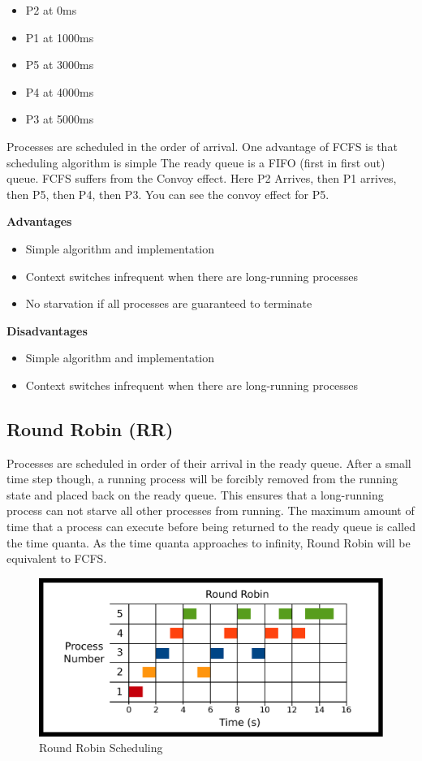 \begin{itemize}
\tightlist
\item
  P2 at 0ms
\item
  P1 at 1000ms
\item
  P5 at 3000ms
\item
  P4 at 4000ms
\item
  P3 at 5000ms
\end{itemize}

Processes are scheduled in the order of arrival.
One advantage of FCFS is that scheduling algorithm is simple
The ready queue is a FIFO (first in first out) queue.
FCFS suffers from the Convoy effect.
Here P2 Arrives, then P1 arrives, then P5, then P4, then P3. You can see the convoy effect for P5.

\textbf{Advantages}

\begin{itemize}
\item Simple algorithm and implementation
\item Context switches infrequent when there are long-running processes
\item No starvation if all processes are guaranteed to terminate
\end{itemize}

\textbf{Disadvantages}
\begin{itemize}
\item Simple algorithm and implementation
\item Context switches infrequent when there are long-running processes

\end{itemize}

\subsection{Round Robin (RR)}

Processes are scheduled in order of their arrival in the ready queue.
After a small time step though, a running process will be forcibly removed from the running state and placed back on the ready queue.
This ensures that a long-running process can not starve all other processes from running.
The maximum amount of time that a process can execute before being returned to the ready queue is called the time quanta.
As the time quanta approaches to infinity, Round Robin will be equivalent to FCFS.

\begin{figure}[H]
\centering
\includegraphics[width=\textwidth]{scheduling/drawings/rr.eps}
\caption{Round Robin Scheduling}
\end{figure}

